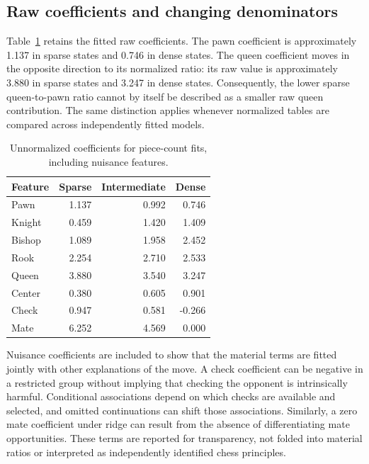 \subsection{Raw coefficients and changing denominators}
Table~\ref{tab:countraw} retains the fitted raw coefficients. The pawn coefficient is approximately 1.137 in sparse states and 0.746 in dense states. The queen coefficient moves in the opposite direction to its normalized ratio: its raw value is approximately 3.880 in sparse states and 3.247 in dense states. Consequently, the lower sparse queen-to-pawn ratio cannot by itself be described as a smaller raw queen contribution. The same distinction applies whenever normalized tables are compared across independently fitted models.
\begin{table}[htbp]\centering
\small
\caption{Unnormalized coefficients for piece-count fits, including nuisance features.}\label{tab:countraw}
\begin{tabular}{lrrr}
\toprule
Feature & Sparse & Intermediate & Dense\\\midrule
Pawn & 1.137 & 0.992 & 0.746\\
Knight & 0.459 & 1.420 & 1.409\\
Bishop & 1.089 & 1.958 & 2.452\\
Rook & 2.254 & 2.710 & 2.533\\
Queen & 3.880 & 3.540 & 3.247\\
Center & 0.380 & 0.605 & 0.901\\
Check & 0.947 & 0.581 & -0.266\\
Mate & 6.252 & 4.569 & 0.000\\
\bottomrule\end{tabular}\end{table}

Nuisance coefficients are included to show that the material terms are fitted jointly with other explanations of the move. A check coefficient can be negative in a restricted group without implying that checking the opponent is intrinsically harmful. Conditional associations depend on which checks are available and selected, and omitted continuations can shift those associations. Similarly, a zero mate coefficient under ridge can result from the absence of differentiating mate opportunities. These terms are reported for transparency, not folded into material ratios or interpreted as independently identified chess principles.

